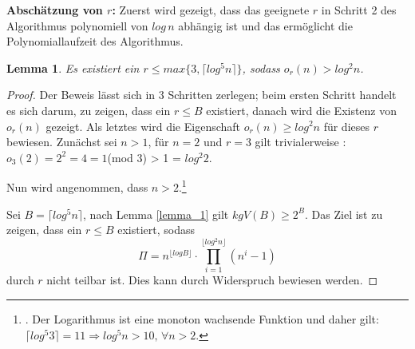\documentclass[12pt,oneside]{article}
\newtheorem{lemma}[theorem]{Lemma}
\theoremstyle{remark}
\theoremstyle{definition}
\begin{document}
\textbf{Abschätzung von $r$:}
Zuerst wird gezeigt, dass das geeignete $r$ in Schritt 2 des Algorithmus polynomiell von $log \, n$ abhängig ist und das ermöglicht die Polynomiallaufzeit des Algorithmus.  

\begin{lemma}\label{limit_of_r}
Es existiert ein $ r \leq max \{ 3, \lceil log^5 n \rceil \}$, sodass $o_{r}(n) > log^2 n$.
\end{lemma}


\begin{proof}
Der Beweis lässt sich in 3 Schritten zerlegen; beim ersten Schritt handelt es sich darum, zu zeigen, dass ein $r \leq B$ existiert, danach wird die Existenz von $o_{r}(n)$ gezeigt. Als letztes wird die Eigenschaft $o_{r}(n) \geq log^2 n$ für dieses $r$ bewiesen.\newline\newline
Zunächst sei $n > 1$, für $n = 2$ und $r = 3$ gilt trivialerweise :\newline\newline $o_{3}(2) = 2^2 = 4 = 1 $(mod 3) > 1 = $log^2 2$.

Nun wird angenommen, dass $n > 2$.\footnote{. Der Logarithmus ist eine monoton wachsende Funktion und daher gilt:\newline $\lceil log^5 3 \rceil = 11 \Rightarrow log^5 n > 10, \,  \forall n > 2$.}\newline\newline

Sei $B = \lceil log^5 n \rceil$, nach Lemma \ref{lemma_1} gilt $kgV(B) \geq 2^B$. Das Ziel ist zu zeigen, dass   ein $r \leq B$ existiert, sodass
\begin{equation}\label{prod_cor}
     \Pi = n^{\lfloor log B \rfloor } \cdot \prod_{i = 1}^{\lfloor log^2 n \rfloor} (n^i - 1)
\end{equation}
durch $r$ nicht teilbar ist. Dies kann durch Widerspruch bewiesen werden.


\end{proof}
\end{document}
